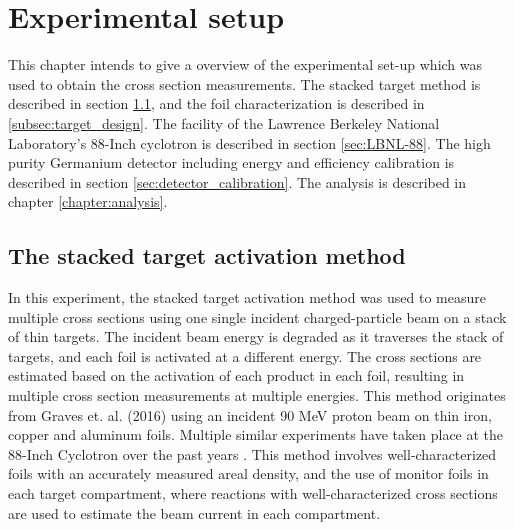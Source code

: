 \chapter{Experimental setup}
This chapter intends to give a overview of the experimental set-up which was used to obtain the cross section measurements. The stacked target method is described in section \ref{sec:stacked_target_method}, and the foil characterization is described in \ref{subsec:target_design}. The facility of the Lawrence Berkeley National Laboratory's 88-Inch cyclotron is described in section \ref{sec:LBNL-88}. The high purity Germanium detector including energy and efficiency calibration is described in section \ref{sec:detector_calibration}. The analysis is described in chapter \ref{chapter:analysis}. 


\section{The stacked target activation method} \label{sec:stacked_target_method}
In this experiment, the stacked target activation method was used to measure multiple cross sections using one single incident charged-particle beam on a stack of thin targets. The incident beam energy is degraded as it traverses the stack of targets, and each foil is activated at a different energy. The cross sections are estimated based on the activation of each product in each foil, resulting in multiple cross section measurements at multiple energies. This method originates from Graves et. al. (2016) \cite{Graves2016} using an incident 90 MeV proton beam on thin iron, copper and aluminum foils. Multiple similar experiments have taken place at the 88-Inch Cyclotron over the past years \cite{Voyles2019, Morrell2020, Voyles2018c}. This method involves well-characterized foils with an accurately measured areal density, and the use of monitor foils in each target compartment, where reactions with well-characterized cross sections are used to estimate the beam current in each compartment.   \\ 


